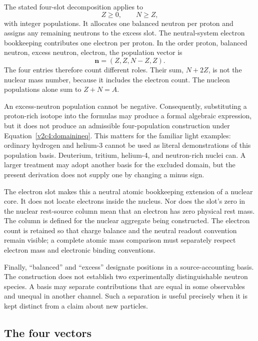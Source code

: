 The stated four-slot decomposition applies to
\begin{equation}
 Z\geq 0,\qquad N\geq Z,
 \label{v2c4:domainineq}
\end{equation}
with integer populations. It allocates one balanced neutron per proton and assigns any remaining neutrons to the excess slot. The neutral-system electron bookkeeping contributes one electron per proton. In the order proton, balanced neutron, excess neutron, electron, the population vector is
\begin{equation}
 \boldsymbol n=(Z,Z,N-Z,Z).
 \label{v2c4:population}
\end{equation}
The four entries therefore count different roles. Their sum, $N+2Z$, is not the nuclear mass number, because it includes the electron count. The nucleon populations alone sum to $Z+N=A$.

An excess-neutron population cannot be negative. Consequently, substituting a proton-rich isotope into the formulas may produce a formal algebraic expression, but it does not produce an admissible four-population construction under Equation~\eqref{v2c4:domainineq}. This matters for the familiar light examples: ordinary hydrogen and helium-3 cannot be used as literal demonstrations of this population basis. Deuterium, tritium, helium-4, and neutron-rich nuclei can. A larger treatment may adopt another basis for the excluded domain, but the present derivation does not supply one by changing a minus sign.

The electron slot makes this a neutral atomic bookkeeping extension of a nuclear core. It does not locate electrons inside the nucleus. Nor does the slot's zero in the nuclear rest-source column mean that an electron has zero physical rest mass. The column is defined for the nuclear aggregate being constructed. The electron count is retained so that charge balance and the neutral readout convention remain visible; a complete atomic mass comparison must separately respect electron mass and electronic binding conventions.

Finally, ``balanced'' and ``excess'' designate positions in a source-accounting basis. The construction does not establish two experimentally distinguishable neutron species. A basis may separate contributions that are equal in some observables and unequal in another channel. Such a separation is useful precisely when it is kept distinct from a claim about new particles.

\subsection{The four vectors}
\label{v2c4:vectors}

